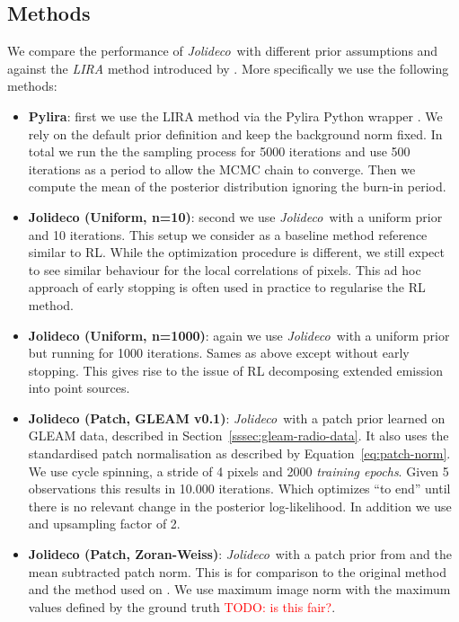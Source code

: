 \documentclass[twocolumn]{aastex631}
\newcommand{\jolideco}{\textit{Jolideco}~}
\newcommand{\todo}[1]{\textcolor{red}{TODO: #1}\PackageWarning{TODO:}{#1!}}
\begin{document}
    \subsection{Methods}
    \label{subsec:methods}
    We compare the performance of \jolideco with different prior assumptions and against the \textit{LIRA} method introduced by \cite{Esch2004}. More specifically we use the following methods:

    \begin{itemize}
        \item \textbf{Pylira}: first we use the LIRA method \citep{Esch2004} via the Pylira Python wrapper \citep{Donath2022}. We rely on the default prior definition and keep the background norm fixed. In total we run the the sampling process for 5000 iterations and use 500 iterations as a  period to allow the MCMC chain to converge. Then we compute the mean of the posterior distribution ignoring the burn-in period.
        
        \item \textbf{Jolideco (Uniform, n=10)}: second we use \jolideco with a uniform prior and 10 iterations. This setup we consider as a baseline method reference similar to RL. While the optimization procedure is different, we still expect to see similar behaviour for the local correlations of pixels. This ad hoc approach of early stopping is often used in practice to regularise the RL method.
        
        \item \textbf{Jolideco (Uniform, n=1000)}: again we use \jolideco with a uniform prior but running for 1000 iterations. Sames as above except without early stopping. This gives rise to the issue of RL decomposing extended emission into point sources. 
        
        \item \textbf{Jolideco (Patch, GLEAM v0.1)}: \jolideco with a patch prior learned on GLEAM data, described in Section~\ref{sssec:gleam-radio-data}. It also uses the standardised patch normalisation as described by Equation~\ref{eq:patch-norm}. We use cycle spinning, a stride of 4 pixels and 2000 \textit{training epochs}. Given 5 observations this results in 10.000 iterations. Which optimizes \enquote{to end} until there is no relevant change in the posterior log-likelihood. In addition we use and upsampling factor of 2.
        
        \item \textbf{Jolideco (Patch, Zoran-Weiss)}: \jolideco with a patch prior from \cite{Zoran2011} and the mean subtracted patch norm. This is for comparison to the original method and the method used on \cite{Bouman2016}. We use maximum image norm with the maximum values defined by the ground truth \todo{is this fair?}.
    \end{itemize}
\end{document}
